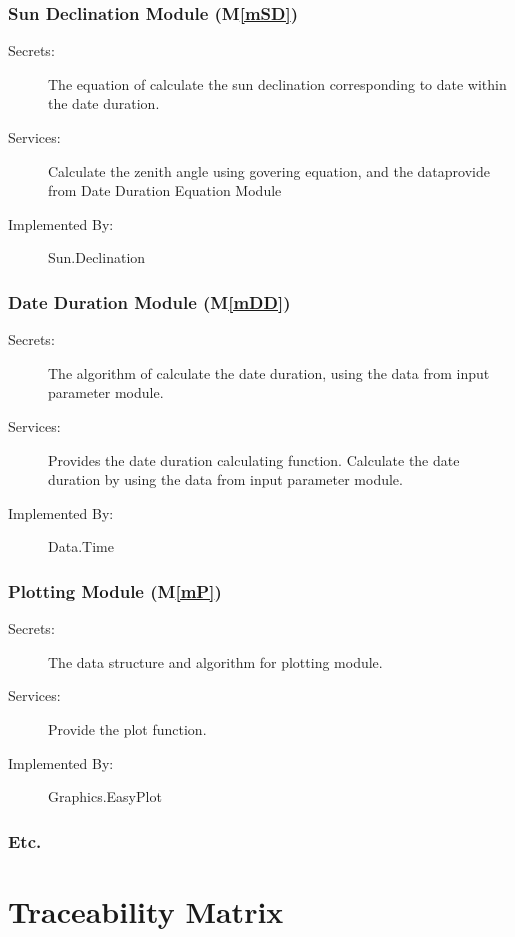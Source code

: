 \documentclass[12pt, titlepage]{article}
\newcommand{\mref}[1]{M\ref{#1}}
\begin{document}
\subsubsection{Sun Declination Module (\mref{mSD})}

\begin{description}
\item[Secrets:]The equation of calculate the sun declination corresponding to
date within the date duration.
\item[Services:]Calculate the zenith angle using govering equation, and the
dataprovide from Date Duration Equation Module
\item[Implemented By:] Sun.Declination
\end{description}


\subsubsection{Date Duration Module (\mref{mDD})}

\begin{description}
\item[Secrets:]The algorithm of calculate the date duration, using the data 
from input parameter module.
\item[Services:] Provides the date duration calculating function. Calculate the 
date duration by using the data from input parameter module.
\item[Implemented By:] Data.Time
\end{description}

\subsubsection{Plotting Module (\mref{mP})}

\begin{description}
\item[Secrets:]The data structure and algorithm for plotting module.
\item[Services:] Provide the plot function.
\item[Implemented By:] Graphics.EasyPlot
\end{description}
\subsubsection{Etc.}


\section{Traceability Matrix} \label{SecTM}
\end{document}
